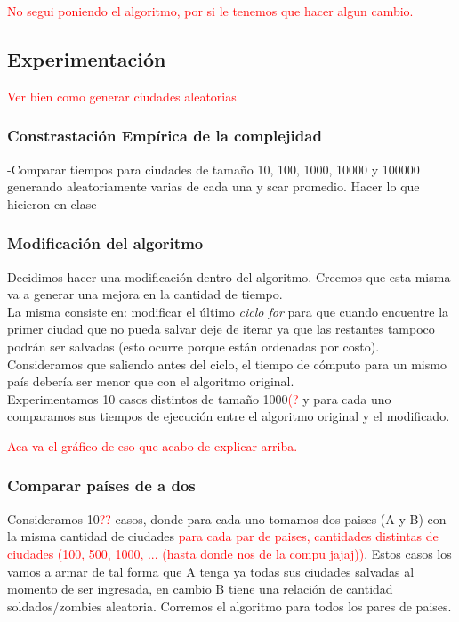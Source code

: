 \documentclass[a4paper]{article}
\begin{document}
\textcolor{red}{No segui poniendo el algoritmo, por si le tenemos que hacer algun cambio.}

\newpage
\subsection{Experimentaci\'on}

\textcolor{red}{Ver bien como generar ciudades aleatorias}
\subsubsection{Constrastaci\'on Emp\'irica de la complejidad}
-Comparar tiempos para ciudades de tama\~no 10, 100, 1000, 10000 y 100000 generando aleatoriamente varias de cada una y scar promedio. Hacer lo que hicieron en clase\\


\newpage
\subsubsection{Modificaci\'on del algoritmo}

Decidimos hacer una modificaci\'on dentro del algoritmo. Creemos que esta misma va a generar una mejora en la cantidad de tiempo.\\

La misma consiste en: modificar el \'ultimo \emph{ciclo for} para que cuando encuentre la primer ciudad que no pueda salvar deje de iterar ya que las restantes tampoco podr\'an ser salvadas (esto ocurre porque est\'an ordenadas por costo).\\

Consideramos que saliendo antes del ciclo, el tiempo de c\'omputo para un mismo pa\'is deber\'ia ser menor que con el algoritmo original.\\

Experimentamos 10 casos distintos de tama\~no 1000\textcolor{red}{(?} y para cada uno comparamos sus tiempos de ejecuci\'on entre el algoritmo original y el modificado.

\textcolor{red}{Aca va el gr\'afico de eso que acabo de explicar arriba.}

\newpage
\subsubsection{Comparar pa\'ises de a dos}

Consideramos 10\textcolor{red}{??} casos, donde para cada uno tomamos dos paises (A y B) con la misma cantidad de ciudades \textcolor{red}{para cada par de paises, cantidades distintas de ciudades (100, 500, 1000, ... (hasta donde nos de la compu jajaj))}. Estos casos los vamos a armar de tal forma que A tenga ya todas sus ciudades salvadas al momento de ser ingresada, en cambio B tiene una relaci\'on de cantidad soldados/zombies aleatoria. Corremos el algoritmo para todos los pares de paises.\\
\end{document}
